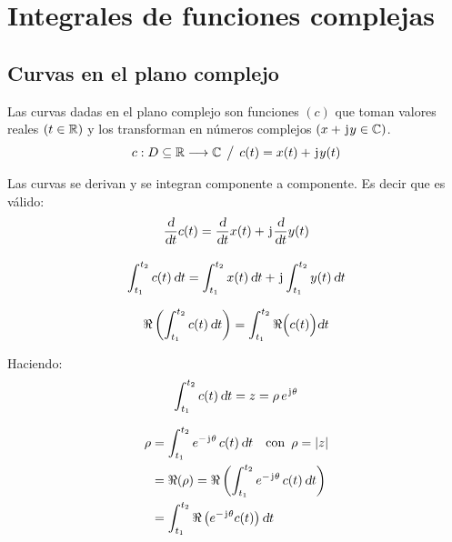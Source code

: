 \chapter{Integrales de funciones complejas}

\section{Curvas en el plano complejo}

Las curvas dadas en el plano complejo son funciones $(c)$ que toman valores reales $(t\in\mathbb{R})$ y los transforman en números complejos $(x + \mkern2mu\mathrm{j}\mkern1mu y \in\mathbb{C})$.
\begin{equation*}
    c: D\subseteq \mathbb{R} \longrightarrow \mathbb{C} \hspace{1ex} \big/ \hspace{1ex} c(t) = x(t) + \mkern2mu\mathrm{j}\mkern1mu y(t)
\end{equation*}

Las curvas se derivan y se integran componente a componente.
Es decir que es válido:
\begin{gather*}
    \frac{\textsl{d}}{\textsl{d} t} c(t) = \frac{\textsl{d}}{\textsl{d} t} x(t) + \mkern2mu\mathrm{j}\mkern1mu \frac{\textsl{d}}{\textsl{d} t} y(t)
    \\[1em]
    \int_{t_1}^{t_2} c(t) \, \textsl{d} t = \int_{t_1}^{t_2} x(t) \, \textsl{d} t + \mkern2mu\mathrm{j}\mkern1mu \int_{t_1}^{t_2} y(t) \, \textsl{d} t
\end{gather*}

\begin{mdframed}[style=PropertyFrame]
    \begin{prop}
    \end{prop}
    \begin{equation*}
        \Re \left( \int_{t_1}^{t_2} c(t) \, \textsl{d} t \right) = \int_{t_1}^{t_2} \Re \Big( c(t) \Big) \textsl{d} t
    \end{equation*}
\end{mdframed}

Haciendo:
\begin{equation*}
    \int_{t_1}^{t_2} c(t) \, \textsl{d} t = z = \rho \, e^{\mkern2mu\mathrm{j}\mkern1mu \theta}
\end{equation*}

\begin{align*}
    \rho &= \int_{t_1}^{t_2} e^{-\mkern2mu\mathrm{j}\mkern1mu \theta} \, c(t) \, \textsl{d} t \quad \textrm{con} \enspace \rho = {\left| {z} \right|}
    \\
    &= \Re (\rho) = \Re \left( \int_{t_1}^{t_2} e^{-\mkern2mu\mathrm{j}\mkern1mu \theta} \, c(t) \, \textsl{d} t \right)
    \\
    &= \int_{t_1}^{t_2} \Re \left( e^{-\mkern2mu\mathrm{j}\mkern1mu \theta} c(t) \right) \textsl{d} t 
\end{align*}

